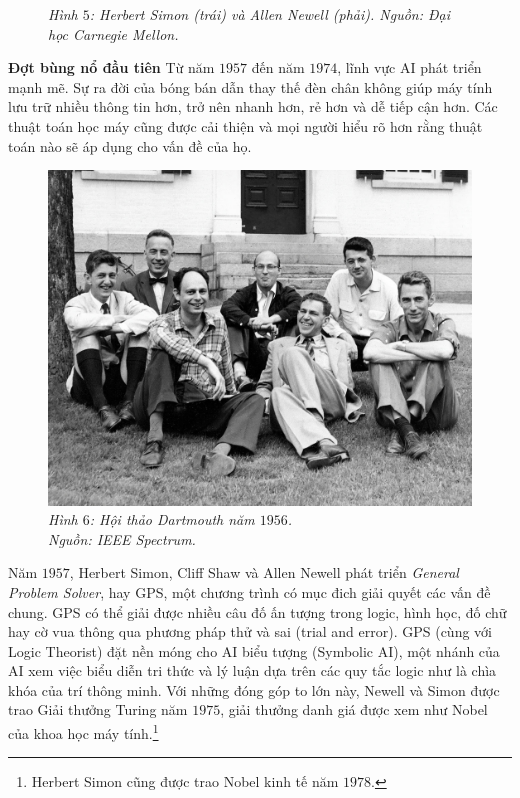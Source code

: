 \begin{multicols}{2}
\begin{figure}[H]
		\caption{\small\textit{\color{cackithi}Hình $5$: Herbert Simon (trái) và Allen Newell (phải). Nguồn: Đại học Carnegie Mellon.}}
		\vspace*{-10pt}
	\end{figure}
	\textbf{\color{cackithi}Đợt bùng nổ đầu tiên}
	\vskip 0.1cm
	Từ năm $1957$ đến năm $1974$, lĩnh vực AI phát triển mạnh mẽ. Sự ra đời của bóng bán dẫn thay thế đèn chân không giúp máy tính lưu trữ nhiều thông tin hơn, trở nên nhanh hơn, rẻ hơn và dễ tiếp cận hơn. Các thuật toán học máy cũng được cải thiện và mọi người hiểu rõ hơn rằng thuật toán nào sẽ áp dụng cho vấn đề của họ.
	\begin{figure}[H]
		\vspace*{5pt}
		\centering
		\captionsetup{labelformat= empty, justification=centering}
		\includegraphics[width= 1\linewidth]{Dartmouth.jpg}
		\caption{\small\textit{\color{cackithi}Hình $6$: Hội thảo Dartmouth năm $1956$.\\ Nguồn: IEEE Spectrum.}}
		\vspace*{-10pt}
	\end{figure}
	Năm $1957$, Herbert Simon, Cliff Shaw và Allen Newell phát triển \textit{General Problem Solver}, hay GPS, một chương trình có mục đich giải quyết các vấn đề chung. GPS có thể giải được nhiều câu đố ấn tượng trong logic, hình học, đố chữ hay cờ vua thông qua phương pháp thử và sai (trial and error). GPS (cùng với Logic Theorist) đặt nền móng cho AI biểu tượng (Symbolic AI), một nhánh của AI xem việc biểu diễn tri thức và lý luận dựa trên các quy tắc logic như là chìa khóa của trí thông minh. Với những đóng góp to lớn này, Newell và Simon được trao Giải thưởng Turing năm $1975$, giải thưởng danh giá được xem như Nobel của khoa học máy tính.\footnote{\color{cackithi}Herbert Simon cũng được trao Nobel kinh tế năm $1978$.}

\end{multicols}
